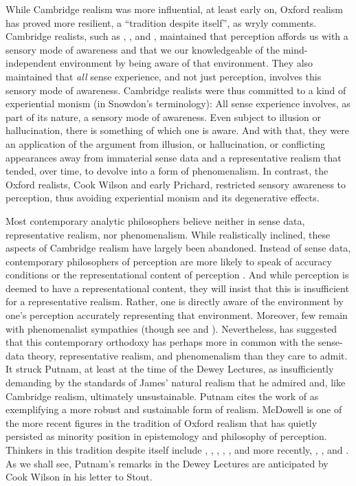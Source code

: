 \documentclass[12pt]{article}
\begin{document}
While Cambridge realism was more influential, at least early on, Oxford realism has proved more resilient, a ``tradition despite itself'', as \citet[xii]{Travis:1989to} wryly comments. Cambridge realists, such as \cite{Russell:1912uq}, \citet{Moore:1953nx}, and \citet{Price:1932fk}, maintained that perception affords us with a sensory mode of awareness and that we our knowledgeable of the mind-independent environment by being aware of that environment. They also maintained that \emph{all} sense experience, and not just perception, involves this sensory mode of awareness. Cambridge realists were thus committed to a kind of experiential monism (in Snowdon's \citeyear{Snowdon:2008oz} terminology): All sense experience involves, as part of its nature, a sensory mode of awareness. Even subject to illusion or hallucination, there is something of which one is aware. And with that, they were an application of the argument from illusion, or hallucination, or conflicting appearances away from immaterial sense data and a representative realism that tended, over time, to devolve into a form of phenomenalism. In contrast, the Oxford realists, Cook Wilson and early Prichard, restricted sensory awareness to perception, thus avoiding experiential monism and its degenerative effects. 

Most contemporary analytic philosophers believe neither in sense data, representative realism, nor phenomenalism. While realistically inclined, these aspects of Cambridge realism have largely been abandoned. Instead of sense data, contemporary philosophers of perception are more likely to speak of accuracy conditions or the representational content of perception \citep[though see][]{Robinson:1994ms}. And while perception is deemed to have a representational content, they will insist that this is insufficient for a representative realism. Rather, one is directly aware of the environment by one's perception accurately representing that environment. Moreover, few remain with phenomenalist sympathies (though see \citealt{Foster:2000ny} and \citealt{Noe:2004fk}). Nevertheless, \citet{Putnam:1994kx} has suggested that this contemporary orthodoxy has perhaps more in common with the sense-data theory, representative realism, and phenomenalism than they care to admit. It struck Putnam, at least at the time of the Dewey Lectures, as insufficiently demanding by the standards of James' natural realism that he admired and, like Cambridge realism, ultimately unsustainable. Putnam cites the work of \citet{McDowell:1994am} as exemplifying a more robust and sustainable form of realism. McDowell is one of the more recent figures in the tradition of Oxford realism that has quietly persisted as minority position in epistemology and philosophy of perception. Thinkers in this tradition despite itself include \citet{Cook-Wilson:1926sf}, \citet{Prichard:1950tg}, \citet{Ryle:1949qr}, \citet{Austin:1946ao,Austin:1962lr}, \citet{Hinton:1973js}, and more recently, \citet{McDowell:1994am}, \citet{Williamson:2000lr}, and \citet{Travis:2008la}. As we shall see, Putnam's remarks in the Dewey Lectures are anticipated by Cook Wilson in his letter to Stout.
\end{document}
